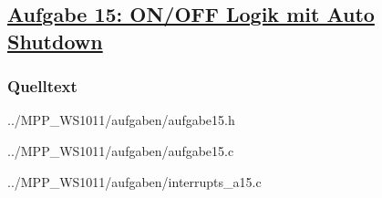 \subsection*
{\href{http://cst.mi.fu-berlin.de/intern/19606-P-MPP/Aufgaben/040502.html}
{Aufgabe 15: ON/OFF Logik mit Auto Shutdown}}

\subsubsection*{Quelltext}

{../MPP_WS1011/aufgaben/aufgabe15.h}


{../MPP_WS1011/aufgaben/aufgabe15.c}


{../MPP_WS1011/aufgaben/interrupts_a15.c}

